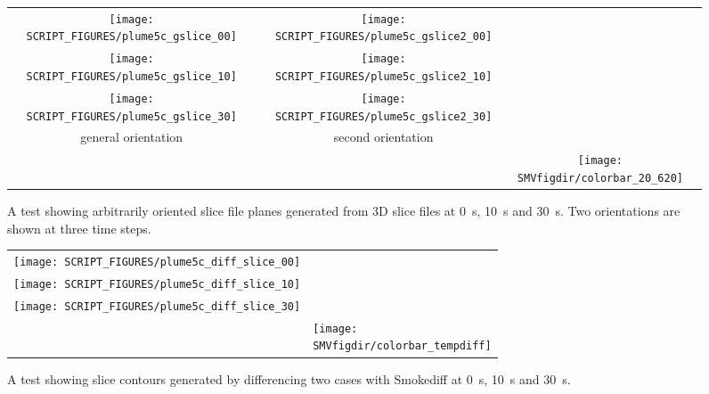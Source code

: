\documentclass[11pt,twoside]{book}
\begin{document}
\begin{figure}[bph]
\begin{center}
\begin{tabular}{cccp{1.0in}}
 \texttt{[image: SCRIPT\_FIGURES/plume5c\_gslice\_00]}&
 \texttt{[image: SCRIPT\_FIGURES/plume5c\_gslice2\_00]}\\

 \texttt{[image: SCRIPT\_FIGURES/plume5c\_gslice\_10]}&
 \texttt{[image: SCRIPT\_FIGURES/plume5c\_gslice2\_10]}\\

 \texttt{[image: SCRIPT\_FIGURES/plume5c\_gslice\_30]}&
 \texttt{[image: SCRIPT\_FIGURES/plume5c\_gslice2\_30]}\\

 general orientation&second orientation\\
 &&\raisebox{0.5in}[0pt]{\texttt{[image: \\SMVfigdir/colorbar\_20\_620]}}\\
 \end{tabular}
\end{center}
 \caption[A test showing arbitrarily oriented slice file planes generated from
 3D slice files]{A test showing arbitrarily oriented slice file planes generated
 from 3D slice files at \SI{0}{s}, \SI{10}{s} and \SI{30}{s}.  Two orientations are
 shown at three time steps. }
\label{figgslicetest}%
\end{figure}

\begin{figure}[bph]
\begin{center}
\begin{tabular}{cp{1.0in}}
 \texttt{[image: SCRIPT\_FIGURES/plume5c\_diff\_slice\_00]}\\
 \texttt{[image: SCRIPT\_FIGURES/plume5c\_diff\_slice\_10]}\\
 \texttt{[image: SCRIPT\_FIGURES/plume5c\_diff\_slice\_30]}\\
&\raisebox{0.5in}[0pt]{\texttt{[image: \\SMVfigdir/colorbar\_tempdiff]}}\\
 \end{tabular}
\end{center}
 \caption[A test showing slice contours generated by differencing two cases with
 Smokediff]{A test showing slice contours generated by differencing
 two cases with Smokediff  at \SI{0}{s}, \SI{10}{s} and \SI{30}{s}.}
\label{figdiffslicetest}%
\end{figure}
\end{document}
